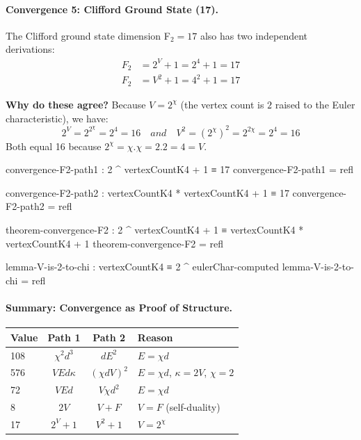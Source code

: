 \documentclass[11pt,a4paper]{book}
\def\cdot{.}%
\def\text#1{#1}%
\begin{document}
\paragraph{Convergence 5: Clifford Ground State (17).}

The Clifford ground state dimension F$_2 = 17$ also has two independent derivations:
\begin{align}
F_2 &= 2^V + 1 = 2^4 + 1 = 17 \\
F_2 &= V^2 + 1 = 4^2 + 1 = 17
\end{align}

\textbf{Why do these agree?} Because $V = 2^\chi$ (the vertex count is $2$ raised to
the Euler characteristic), we have:
\[
2^V = 2^{2^\chi} = 2^4 = 16 \quad \text{and} \quad V^2 = (2^\chi)^2 = 2^{2\chi} = 2^4 = 16
\]
Both equal 16 because $2^\chi = \chi \cdot \chi = 2 \cdot 2 = 4 = V$.

\begin{code}
convergence-F2-path1 : 2 ^ vertexCountK4 + 1 ≡ 17
convergence-F2-path1 = refl

convergence-F2-path2 : vertexCountK4 * vertexCountK4 + 1 ≡ 17
convergence-F2-path2 = refl

theorem-convergence-F2 : 2 ^ vertexCountK4 + 1 ≡ vertexCountK4 * vertexCountK4 + 1
theorem-convergence-F2 = refl

lemma-V-is-2-to-chi : vertexCountK4 ≡ 2 ^ eulerChar-computed
lemma-V-is-2-to-chi = refl
\end{code}

\paragraph{Summary: Convergence as Proof of Structure.}

\begin{center}
\begin{tabular}{|l|c|c|l|}
\hline
\textbf{Value} & \textbf{Path 1} & \textbf{Path 2} & \textbf{Reason} \\
\hline
108 & $\chi^2 d^3$ & $d E^2$ & $E = \chi d$ \\
576 & $V E d \kappa$ & $(\chi d V)^2$ & $E = \chi d$, $\kappa = 2V$, $\chi = 2$ \\
72 & $V E d$ & $V \chi d^2$ & $E = \chi d$ \\
8 & $2V$ & $V + F$ & $V = F$ (self-duality) \\
17 & $2^V + 1$ & $V^2 + 1$ & $V = 2^\chi$ \\
\hline
\end{tabular}
\end{center}
\end{document}
